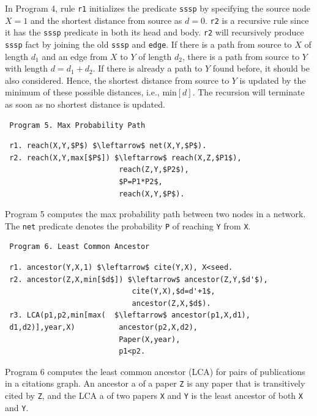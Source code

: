 \begin{appendix}
In Program 4, rule \texttt{r1} initializes the predicate \texttt{sssp} by specifying the source node $X=1$ and the shortest distance from source as $d=0$. \texttt{r2} is a recursive rule since it has the \texttt{sssp} predicate in both its head and body. \texttt{r2} will recursively produce \texttt{sssp} fact by joining the old \texttt{sssp} and \texttt{edge}. If there is a path from source to $X$ of length $d_1$ and an edge from $X$ to $Y$ of length $d_2$, there is a path from source to $Y$ with length $d=d_1+d_2$. If there is already a path to $Y$ found before, it should be also considered. Hence, the shortest distance from source to $Y$ is updated by the minimum of these possible distances, i.e., min$[d]$. The recursion will terminate as soon as no shortest distance is updated.
 
 
 \begin{verbatim}
 Program 5. Max Probability Path
 \end{verbatim}\vspace{-0.1in}\small
 \begin{lstlisting}
 r1. reach(X,Y,$P$) $\leftarrow$ net(X,Y,$P$).
 r2. reach(X,Y,max[$P$]) $\leftarrow$ reach(X,Z,$P1$),
                          reach(Z,Y,$P2$),
                          $P=P1*P2$,
                          reach(X,Y,$P$).
 \end{lstlisting}
 \normalsize
 
 Program 5 \cite{7113340} computes the max probability path between two nodes in a network. The \texttt{net} predicate denotes the probability \texttt{P} of reaching \texttt{Y} from \texttt{X}.
 
 \begin{verbatim}
 Program 6. Least Common Ancestor
 \end{verbatim}\small
 \begin{lstlisting}
 r1. ancestor(Y,X,1) $\leftarrow$ cite(Y,X), X<seed.
 r2. ancestor(Z,X,min[$d$]) $\leftarrow$ ancestor(Z,Y,$d'$),
                             cite(Y,X),$d=d'+1$,
                             ancestor(Z,X,$d$).
 r3. LCA(p1,p2,min[max(  $\leftarrow$ ancestor(p1,X,d1),
 d1,d2)],year,X)          ancestor(p2,X,d2),
                          Paper(X,year),
                          p1<p2.
 \end{lstlisting}
 \normalsize
 
 Program 6 \cite{Wang:2015:AFR:2824032.2824052} computes the least common ancestor (LCA) for pairs of publications in a citations graph. An ancestor a of a paper \texttt{Z} is any paper that is transitively cited by \texttt{Z}, and the LCA a of two papers \texttt{X} and \texttt{Y} is the least ancestor of both \texttt{X} and \texttt{Y}.
 

\end{appendix}
